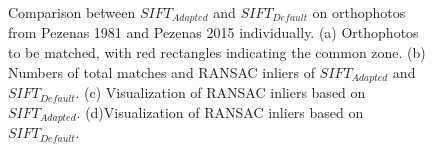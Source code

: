 \begin{figure}[htbp]
\begin{center}
{\begin{minipage}[t]{0.48\linewidth}
			\end{minipage}%
		}
		\caption{Comparison between $SIFT_{Adapted}$ and $SIFT_{Default}$ on orthophotos from Pezenas 1981 and Pezenas 2015 individually. (a) Orthophotos to be matched, with red rectangles indicating the common zone. (b) Numbers of total matches and RANSAC inliers of $SIFT_{Adapted}$ and $SIFT_{Default}$. (c) Visualization of RANSAC inliers based on $SIFT_{Adapted}$. (d)Visualization of RANSAC inliers based on $SIFT_{Default}$.}
		\label{SIFTComp_Ortho}
	\end{center}
\end{figure} 


